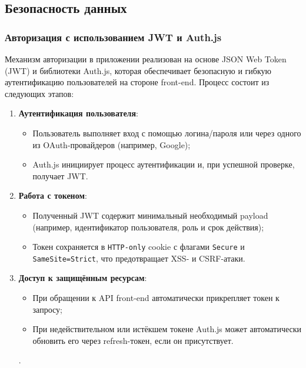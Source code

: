\subsection{Безопасность данных}

\subsubsection{Авторизация с использованием JWT и Auth.js}
Механизм авторизации в приложении реализован на основе JSON Web Token (JWT) и библиотеки Auth.js, которая обеспечивает безопасную и гибкую аутентификацию пользователей на стороне front-end. Процесс состоит из следующих этапов:
\begin{enumerate}
  \item \textbf{Аутентификация пользователя}:
    \begin{itemize}
      \item Пользователь выполняет вход с помощью логина/пароля или через одного из OAuth-провайдеров (например, Google);
      \item Auth.js инициирует процесс аутентификации и, при успешной проверке, получает JWT.
    \end{itemize}
  \item \textbf{Работа с токеном}:
    \begin{itemize}
      \item Полученный JWT содержит минимальный необходимый payload (например, идентификатор пользователя, роль и срок действия);
      \item Токен сохраняется в \texttt{HTTP-only} cookie с флагами \texttt{Secure} и \texttt{SameSite=Strict}, что предотвращает XSS- и CSRF-атаки.
    \end{itemize}
  \item \textbf{Доступ к защищённым ресурсам}:
    \begin{itemize}
      \item При обращении к API front-end автоматически прикрепляет токен к запросу;
      \item При недействительном или истёкшем токене Auth.js может автоматически обновить его через refresh-токен, если он присутствует.
    \end{itemize}.
\end{enumerate}

